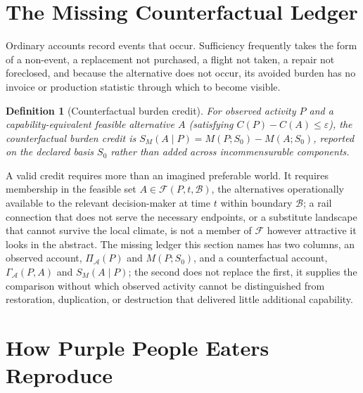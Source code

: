 \documentclass[11pt]{article}
\newtheorem{definition}{Definition}[section]
\begin{document}
\section{The Missing Counterfactual Ledger}

Ordinary accounts record events that occur. Sufficiency frequently takes the form of a non-event, a replacement not purchased, a flight not taken, a repair not foreclosed, and because the alternative does not occur, its avoided burden has no invoice or production statistic through which to become visible.

\begin{definition}[Counterfactual burden credit]
For observed activity $P$ and a capability-equivalent feasible alternative $A$ (satisfying $C(P) - C(A) \leq \varepsilon$), the counterfactual burden credit is $S_M(A \mid P) = M(P; S_0) - M(A; S_0)$, reported on the declared basis $S_0$ rather than added across incommensurable components.
\end{definition}

A valid credit requires more than an imagined preferable world. It requires membership in the feasible set $A \in \mathcal{F}(P, t, \mathcal{B})$, the alternatives operationally available to the relevant decision-maker at time $t$ within boundary $\mathcal{B}$; a rail connection that does not serve the necessary endpoints, or a substitute landscape that cannot survive the local climate, is not a member of $\mathcal{F}$ however attractive it looks in the abstract. The missing ledger this section names has two columns, an observed account, $\Pi_{\mathcal{A}}(P)$ and $M(P; S_0)$, and a counterfactual account, $\Gamma_{\mathcal{A}}(P, A)$ and $S_M(A \mid P)$; the second does not replace the first, it supplies the comparison without which observed activity cannot be distinguished from restoration, duplication, or destruction that delivered little additional capability.

\section{How Purple People Eaters Reproduce}
\end{document}
